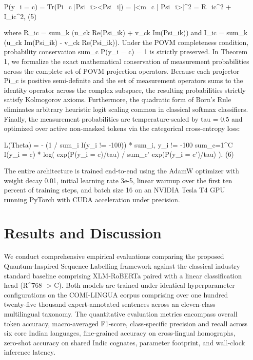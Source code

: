 \documentclass[10pt,twocolumn,letterpaper]{article}
\theoremstyle{definition}
\begin{document}
P(y\_i = c) = Tr(Pi\_c |Psi\_i><Psi\_i|) = |<m\_c | Psi\_i>|^2 = R\_{ic}^2 + I\_{ic}^2,    (5)

where R\_{ic} = sum\_k (u\_{ck} Re(Psi\_{ik}) + v\_{ck} Im(Psi\_{ik})) and I\_{ic} = sum\_k (u\_{ck} Im(Psi\_{ik}) - v\_{ck} Re(Psi\_{ik})). Under the POVM completeness condition, probability conservation sum\_c P(y\_i = c) = 1 is strictly preserved. In Theorem 1, we formalize the exact mathematical conservation of measurement probabilities across the complete set of POVM projection operators. Because each projector Pi\_c is positive semi-definite and the set of measurement operators sums to the identity operator across the complex subspace, the resulting probabilities strictly satisfy Kolmogorov axioms. Furthermore, the quadratic form of Born's Rule eliminates arbitrary heuristic logit scaling common in classical softmax classifiers. Finally, the measurement probabilities are temperature-scaled by tau = 0.5 and optimized over active non-masked tokens via the categorical cross-entropy loss:

L(Theta) = - (1 / sum\_i I(y\_i != -100)) * sum\_{i, y\_i != -100} sum\_{c=1}^C I(y\_i = c) * log( exp(P(y\_i = c)/tau) / sum\_{c'} exp(P(y\_i = c')/tau) ).    (6)

The entire architecture is trained end-to-end using the AdamW optimizer with weight decay 0.01, initial learning rate 3e-5, linear warmup over the first ten percent of training steps, and batch size 16 on an NVIDIA Tesla T4 GPU running PyTorch with CUDA acceleration under precision.

\section{Results and Discussion}
We conduct comprehensive empirical evaluations comparing the proposed Quantum-Inspired Sequence Labelling framework against the classical industry standard baseline comprising XLM-RoBERTa paired with a linear classification head (R^{768 -> C}). Both models are trained under identical hyperparameter configurations on the COMI-LINGUA corpus comprising over one hundred twenty-five thousand expert-annotated sentences across an eleven-class multilingual taxonomy. The quantitative evaluation metrics encompass overall token accuracy, macro-averaged F1-score, class-specific precision and recall across six core Indian languages, fine-grained accuracy on cross-lingual homographs, zero-shot accuracy on shared Indic cognates, parameter footprint, and wall-clock inference latency.
\end{document}
